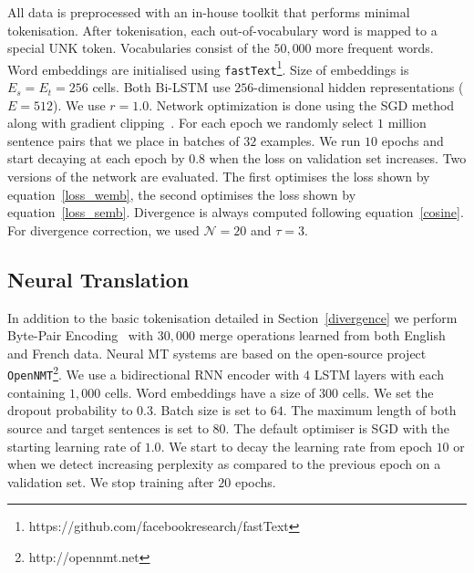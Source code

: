 \documentclass[11pt,a4paper]{article}
\begin{document}
All data is preprocessed with an in-house toolkit that performs minimal tokenisation. %
After tokenisation, each out-of-vocabulary word is mapped to a special UNK token.
Vocabularies consist of the $50,000$ more frequent words.
Word embeddings are initialised using \texttt{fastText}\footnote{https://github.com/facebookresearch/fastText}. %
Size of embeddings is $E_s=E_t=256$ cells. 
Both Bi-LSTM use $256$-dimensional hidden representations ($E=512$).
We use $r=1.0$. 
Network optimization is done using the SGD method along with gradient clipping~\cite{Pascanu:2013:DTR:3042817.3043083}. 
For each epoch we randomly select $1$ million sentence pairs that we place in batches of $32$ examples.  
We run $10$ epochs and start decaying at each epoch by $0.8$ when the loss on validation set increases. 
Two versions of the network are evaluated. 
The first optimises the loss shown by equation~\ref{loss_wemb}, the second optimises the loss shown by equation~\ref{loss_semb}. 
Divergence is always computed following equation~\ref{cosine}. 
For divergence correction, we used $\mathcal{N}=20$ and $\tau=3$.

\subsection{Neural Translation}
\label{translation}

In addition to the basic tokenisation detailed in Section~\ref{divergence} we perform Byte-Pair Encoding~\cite{Sennrich2016} with $30,000$ merge operations learned from both English and French data.
Neural MT systems are based on the open-source project \texttt{OpenNMT}\footnote{http://opennmt.net}. We use a bidirectional RNN encoder with $4$ LSTM layers with each containing $1,000$ cells. 
Word embeddings have a size of $300$ cells. We set the dropout probability to $0.3$. Batch size is set to $64$. The maximum length of both source and target sentences is set to $80$. %
The default optimiser is SGD with the starting learning rate of $1.0$. We start to decay the learning rate from epoch $10$ or when we detect increasing perplexity as compared to the previous epoch on a validation set. We stop training after $20$ epochs.
\end{document}
